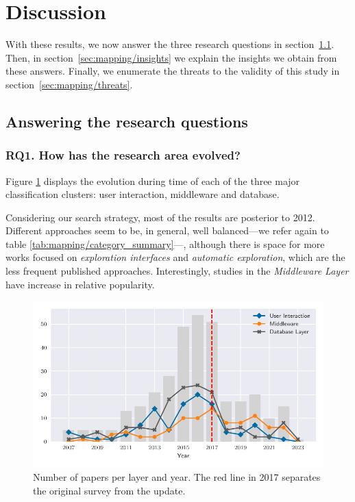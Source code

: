 \section{Discussion}
\label{sec:mapping/discussion}

With these results, we now answer the three research questions in
section~\ref{sec:mapping/answers}. Then, in section~\ref{sec:mapping/insights}
we explain the insights we obtain from these answers. Finally,
we enumerate the threats to the validity of this study in
section~\ref{sec:mapping/threats}.

\subsection{Answering the research questions}
\label{sec:mapping/answers}

\subsubsection{RQ1. How has the research area evolved?}
Figure \ref{fig:mapping/layers_histogram} displays the evolution during time
of each of the three major classification clusters: user interaction,
middleware and database.

Considering our search strategy, most of the
results are posterior to 2012. Different approaches seem to be, in general, well
balanced---we refer again to table \ref{tab:mapping/category_summary}---, although there
is space for more works focused on \emph{exploration interfaces} and
\emph{automatic exploration}, which are the less frequent published approaches. Interestingly,
studies in the \emph{Middleware Layer} have increase in relative popularity.

\begin{figure}[hptb]
    \centering
    \includegraphics{images/3_mapping/layer_histogram}
    \caption[Number of studies per  layer and year.]{
        Number of papers per layer and year.
        The red line in 2017 separates the original survey from the update.
    }
    \label{fig:mapping/layers_histogram}
\end{figure}

